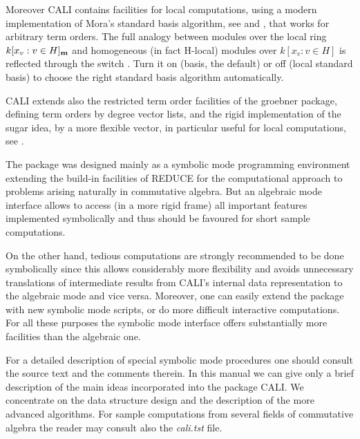 Moreover CALI contains facilities for local computations, using a
modern implementation of Mora's standard basis algorithm, see
\cite{MPT} and \cite{Gr23}, that works for arbitrary term orders.
The full analogy between modules over the local ring \linebreak[1]
$k[x_v:v\in H]_{\bf m}$ and homogeneous (in fact H-local) modules
over $k[x_v:v\in H]$ is reflected through the switch
.  Turn it on (\gr basis, the default) or off (local
standard basis) to choose the right standard basis algorithm
automatically.

CALI extends also the restricted term order facilities of the
groebner package, defining term orders by degree vector lists, and
the rigid implementation of the sugar idea, by a more flexible
 vector, in particular useful for local computations, see
\cite{Gr23}. 
\medskip

The package was designed mainly as a symbolic mode programming
environment extending the build-in facilities of REDUCE for the
computational approach to problems arising naturally in commutative
algebra. But an algebraic mode interface allows to access (in a more
rigid frame) all important features implemented symbolically and thus
should be favoured for short sample computations.

On the other hand, tedious computations are strongly recommended to
be done symbolically since this allows considerably more flexibility
and avoids unnecessary translations of intermediate results from
CALI's internal data representation to the algebraic mode and vice
versa. Moreover, one can easily extend the package with new symbolic
mode scripts, or do more difficult interactive computations. For all
these purposes the symbolic mode interface offers substantially more
facilities than the algebraic one.
\medskip

For a detailed description of special symbolic mode procedures one
should consult the source text and the comments therein. In this
manual we can give only a brief description of the main ideas
incorporated into the package CALI. We concentrate on the data
structure design and the description of the more advanced algorithms.
For sample computations from several fields of commutative algebra
the reader may consult also the {\em cali.tst} file.
\medskip

